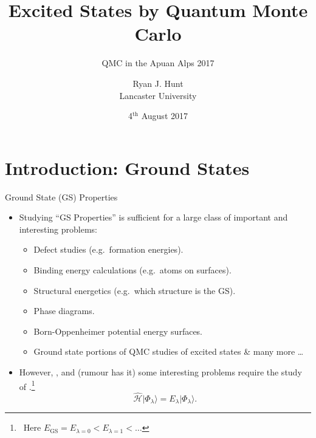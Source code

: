 \documentclass[12pt, pdf, hyperref={draft}, usenames, dvipsnames,
aspectratio=169]{beamer}
\title{Excited States by Quantum Monte Carlo}
\subtitle{QMC in the Apuan Alps 2017}
\author{Ryan J. Hunt\\
        Lancaster University}
\date{4$^{\text{th}}$ August 2017}
\newcommand{\ket}[1]{\lvert{#1}\rangle}
\newcommand{\red}[1]{{\bf\color{LancsRed}{#1}}}
\newcommand{\blue}[1]{{\bf\color{NavyBlue}{#1}}}
\begin{document}
\begin{frame}[plain]
  \titlepage\end{frame}





\setlength\abovedisplayskip{3pt}
\setlength\belowdisplayskip{3pt}


\section{Introduction: Ground States}\label{sec:introduction_ground_states}
\begin{frame}{Ground State (GS) Properties}
\begin{itemize}
  \item Studying ``GS Properties'' is sufficient for a large class of
  important and interesting problems:

  \begin{itemize}
    \item Defect studies (e.g.\ formation energies).
    \item Binding energy calculations (e.g.\ atoms on surfaces).
    \item Structural energetics (e.g.\ which structure is the GS).
    \item Phase diagrams.
    \item Born-Oppenheimer potential energy surfaces.
    \item Ground state portions of QMC studies of excited states \& many more
    \ldots
  \end{itemize}

  \item However, \blue{spectroscopy exists}, and (rumour has it) some
  interesting problems require the study of \red{excited electronic
  states}.\footnote{\ Here $E_{\text{GS}} = E_{\lambda = 0} < E_{\lambda = 1} <
  \ldots$}
  \begin{equation}
    \mathcal{\hat H} \ket{\Phi_\lambda} =
    E_\lambda\ket{\Phi_\lambda}.
  \end{equation}
\end{itemize}
\end{frame}
\end{document}
